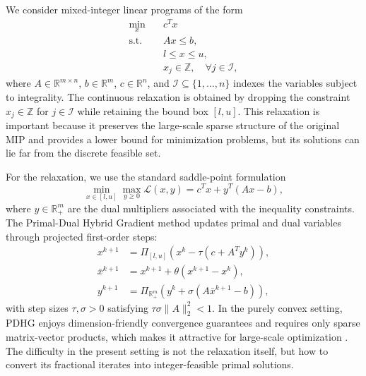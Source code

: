 We consider mixed-integer linear programs of the form
\begin{equation}
\label{eq:milp}
\begin{aligned}
    \min_{x} \quad & c^T x \\
    \text{s.t.} \quad & Ax \leq b, \\
    & l \leq x \leq u, \\
    & x_j \in \mathbb{Z}, \quad \forall j \in \mathcal{I},
\end{aligned}
\end{equation}
where $A \in \mathbb{R}^{m \times n}$, $b \in \mathbb{R}^m$, $c \in \mathbb{R}^n$, and $\mathcal{I} \subseteq \{1, \ldots, n\}$ indexes the variables subject to integrality. The continuous relaxation is obtained by dropping the constraint $x_j \in \mathbb{Z}$ for $j \in \mathcal{I}$ while retaining the bound box $[l, u]$. This relaxation is important because it preserves the large-scale sparse structure of the original MIP and provides a lower bound for minimization problems, but its solutions can lie far from the discrete feasible set.

For the relaxation, we use the standard saddle-point formulation
\begin{equation}
\label{eq:saddle}
    \min_{x \in [l,u]} \max_{y \geq 0} \mathcal{L}(x, y)
    = c^T x + y^T (Ax - b),
\end{equation}
where $y \in \mathbb{R}^m_+$ are the dual multipliers associated with the inequality constraints. The Primal-Dual Hybrid Gradient method updates primal and dual variables through projected first-order steps:
\begin{equation}
\label{eq:pdhg}
\begin{aligned}
    x^{k+1} &= \Pi_{[l,u]}\left(x^k - \tau(c + A^T y^k)\right), \\
    \bar{x}^{k+1} &= x^{k+1} + \theta (x^{k+1} - x^k), \\
    y^{k+1} &= \Pi_{\mathbb{R}^m_+}\left(y^k + \sigma(A\bar{x}^{k+1} - b)\right),
\end{aligned}
\end{equation}
with step sizes $\tau, \sigma > 0$ satisfying $\tau \sigma \|A\|_2^2 < 1$. In the purely convex setting, PDHG enjoys dimension-friendly convergence guarantees and requires only sparse matrix-vector products, which makes it attractive for large-scale optimization \cite{chambolle2011first,lu2023cupdlp}. The difficulty in the present setting is not the relaxation itself, but how to convert its fractional iterates into integer-feasible primal solutions.

